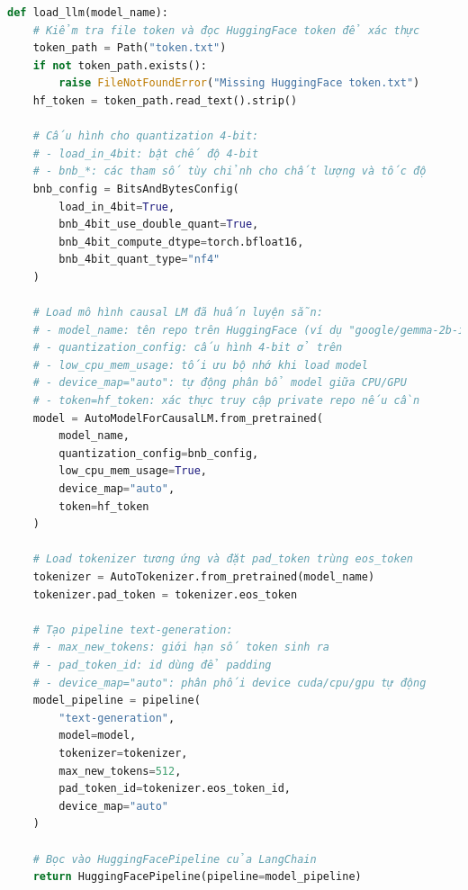 \documentclass[11pt]{article}
\begin{document}
\begin{lstlisting}[language=Python, caption=Tải và cấu hình LLM với comment giải thích]
def load_llm(model_name):
    # Kiểm tra file token và đọc HuggingFace token để xác thực
    token_path = Path("token.txt")
    if not token_path.exists():
        raise FileNotFoundError("Missing HuggingFace token.txt")
    hf_token = token_path.read_text().strip()

    # Cấu hình cho quantization 4-bit:
    # - load_in_4bit: bật chế độ 4-bit
    # - bnb_*: các tham số tùy chỉnh cho chất lượng và tốc độ
    bnb_config = BitsAndBytesConfig(
        load_in_4bit=True,
        bnb_4bit_use_double_quant=True,
        bnb_4bit_compute_dtype=torch.bfloat16,
        bnb_4bit_quant_type="nf4"
    )

    # Load mô hình causal LM đã huấn luyện sẵn:
    # - model_name: tên repo trên HuggingFace (ví dụ "google/gemma-2b-it")
    # - quantization_config: cấu hình 4-bit ở trên
    # - low_cpu_mem_usage: tối ưu bộ nhớ khi load model
    # - device_map="auto": tự động phân bổ model giữa CPU/GPU
    # - token=hf_token: xác thực truy cập private repo nếu cần
    model = AutoModelForCausalLM.from_pretrained(
        model_name,
        quantization_config=bnb_config,
        low_cpu_mem_usage=True,
        device_map="auto",
        token=hf_token
    )

    # Load tokenizer tương ứng và đặt pad_token trùng eos_token
    tokenizer = AutoTokenizer.from_pretrained(model_name)
    tokenizer.pad_token = tokenizer.eos_token

    # Tạo pipeline text-generation:
    # - max_new_tokens: giới hạn số token sinh ra
    # - pad_token_id: id dùng để padding
    # - device_map="auto": phân phối device cuda/cpu/gpu tự động
    model_pipeline = pipeline(
        "text-generation",
        model=model,
        tokenizer=tokenizer,
        max_new_tokens=512,
        pad_token_id=tokenizer.eos_token_id,
        device_map="auto"
    )

    # Bọc vào HuggingFacePipeline của LangChain
    return HuggingFacePipeline(pipeline=model_pipeline)
\end{lstlisting}




\end{document}
